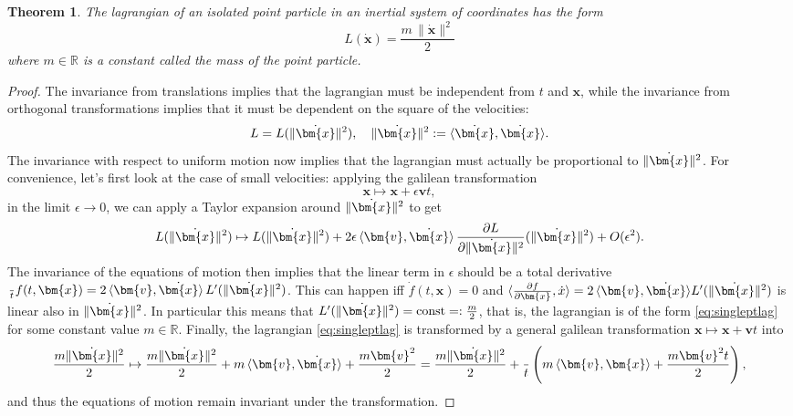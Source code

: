\documentclass[english,fontsize=11pt,paper=a5,oneside]{scrbook}
\newcommand{\R}{\mathbb{R}}
\newcommand{\bx}{\bm{x}}
\newcommand{\lag}{\langle}
\newcommand{\rag}{\rangle}
\let\d\relax
\DeclareMathOperator{\d}{d}
\newtheorem{theorem}{Theorem}[chapter]
\theoremstyle{definition}
\begin{document}
\begin{theorem}
The lagrangian of an isolated point particle in an inertial system of coordinates has the form 
\begin{equation}\label{eq:singleptlag}
    L(\dot{\bm{x}}) = \frac{m\,\|\dot{\bm{x}}\|^2}2
\end{equation}
where $m\in\R$ is a constant called the \emph{mass} of the point particle.
\end{theorem}
\begin{proof}
    The invariance from translations implies that the lagrangian must be independent from $t$ and $\bx$, while the invariance from orthogonal transformations implies that it must be dependent on the square of the velocities:
    \begin{equation}
        L = L(\|\dot\bx\|^2), \quad \|\dot\bx\|^2 := \lag\dot \bx, \dot \bx\rag.
    \end{equation}
    The invariance with respect to uniform motion now implies that the lagrangian must actually be proportional to $\|\dot\bx\|^2$.
    For convenience, let's first look at the case of small velocities: applying the galilean transformation
    \begin{equation}
        \bx \mapsto \bx + \epsilon \bm{v}t,
    \end{equation}
    in the limit $\epsilon \to 0$, we can apply a Taylor expansion around $\|\dot\bx\|^2$ to get
    \begin{equation}
        L(\|\dot\bx\|^2) \mapsto L(\|\dot\bx\|^2) + 2\epsilon\,\lag\bm{v}, \dot\bx\rag\,\frac{\partial L}{\partial \|\dot\bx\|^2}(\|\dot\bx\|^2) + O(\epsilon^2).
    \end{equation}
    The invariance of the equations of motion then implies that the linear term in $\epsilon$ should be a total derivative $\frac{\d }{\d t} f(t, \bx) = 2\,\lag\bm{v}, \dot\bx\rag\,L'(\|\dot\bx\|^2)$.
    This can happen iff $\dot f(t, \bx) = 0$ and $\lag \frac{\partial f}{\partial \bx}, \dot x\rag  = 2\,\lag\bm{v}, \dot\bx\rag L'(\|\dot\bx\|^2)$ is linear also in $\|\dot\bx\|^2$.
    In particular this means that $L'(\|\dot\bx\|^2) = \mathrm{const} =: \frac{m}2$, that is, the lagrangian is of the form \eqref{eq:singleptlag} for some constant value $m\in\R$.
    Finally, the lagrangian \eqref{eq:singleptlag} is transformed by a general galilean transformation $\bx \mapsto \bx + \bm{v}t$ into
    \begin{equation}
        \frac{m \|\dot\bx\|^2}2 \mapsto
        \frac{m \|\dot\bx\|^2}2 + m\,\lag\bm{v},\dot\bx\rag + \frac{m \bm{v}^2}2
        = \frac{m \|\dot\bx\|^2}2 + \frac{\d }{\d t}\left(m\,\lag\bm{v},\bx\rag + \frac{m \bm{v}^2 t}2\right),
    \end{equation}
    and thus the equations of motion remain invariant under the transformation.
\end{proof}
\end{document}
